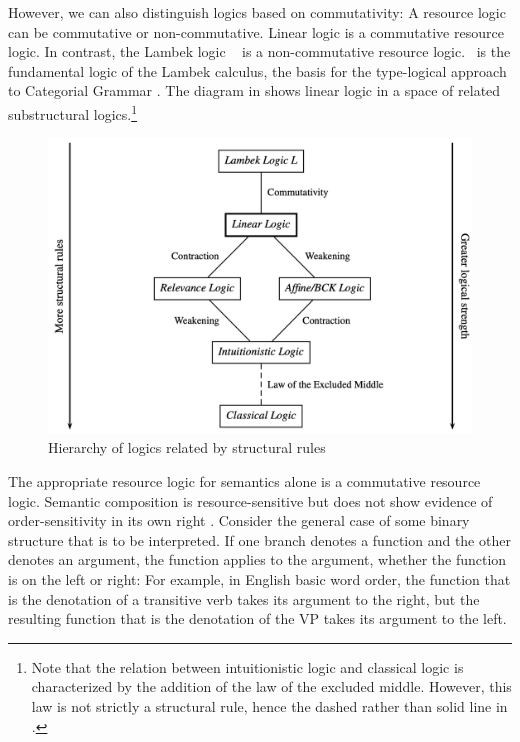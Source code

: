 \documentclass[output=paper,hidelinks]{langscibook}
\begin{document}
However, we can also distinguish logics based on commutativity: A resource logic can be commutative
or non-commutative. Linear logic is a commutative resource logic. In
contrast, the Lambek logic \laml\ \citep{lambek1958} is
a non-commutative resource logic. \laml\ is the fundamental logic of the Lambek
calculus, the basis for the type-logical approach to Categorial
Grammar \citep[see, e.g.,][]{vanbenthem91,moortgat97}. The diagram in
 shows linear logic in a space of related
substructural logics.\footnote{Note that the relation between intuitionistic logic and classical logic
is characterized by the addition of the law of the excluded
middle. However, this law is not strictly a structural rule, hence the
dashed rather than solid line in .}

\begin{figure}
  \centering
  \includegraphics[scale=.4]{figures/Glue/substructural-logics.png}
  \caption{\label{fig:hierarchy}Hierarchy of logics related by
  structural rules  \citep[103; used with permission]{Asudeh12}}
  \label{fig:Glue:1}
\end{figure}

The appropriate resource logic for semantics alone is a commutative
resource logic. Semantic composition is resource-sensitive but does not show
evidence of order-sensitivity in its own
right \citep[ch.\,5]{Asudeh12}. Consider the general case of some
binary structure that is to be
interpreted. If one branch denotes a function and the other denotes an
argument, the function applies to the argument, whether the function is on the
left or right:
%
For example, in English basic word order, the function that is the
denotation of a transitive verb takes its argument to the right, but
the resulting function that is the denotation of the VP takes its
argument to the left. 
\end{document}
